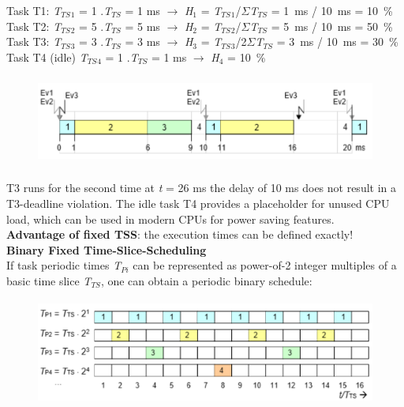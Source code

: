 Task T1:    \textit{T${}_{TS}$}${}_{1}$ = 1 $.$\textit{T${}_{TS}$} = 1 ms $\rightarrow$ \textit{H}${}_{1}$ = \textit{T${}_{TS}$}${}_{1}$/$\Sigma$\textit{T${}_{TS}$} = 1~ms / 10~ms = 10~\%
Task T2:    \textit{T${}_{TS}$}${}_{2}$ = 5 $.$\textit{T${}_{TS}$} = 5 ms $\rightarrow$ \textit{H}${}_{2}$ = \textit{T${}_{TS}$}${}_{2}$/$\Sigma$\textit{T${}_{TS}$} = 5~ms / 10~ms = 50~\%
Task T3:     \textit{T${}_{TS}$}${}_{3}$ = 3 $.$\textit{T${}_{TS}$} = 3 ms $\rightarrow$ \textit{H}${}_{3}$ = \textit{T${}_{TS}$}${}_{3}$/2$\Sigma$\textit{T${}_{TS}$} = 3~ms / 10~ms = 30~\%
Task T4 (idle) \textit{T${}_{TS}$}${}_{4}$ = 1 $.$\textit{T${}_{TS}$} = 1 ms $\rightarrow$ \textit{H}${}_{4}$ = 10~\%

	\begin{figure}[h]
    \centering
    \includegraphics[width=13cm, height=3cm]{Images/image93.png}
    \label{fig:Fig 38}
    \end{figure}

T3 runs for the second time at \textit{t} = 26 ms the delay of 10 ms does not result in a T3-deadline violation. The idle task T4 provides a placeholder for unused CPU load, which can be used in modern CPUs for power saving features.\\

\textbf{Advantage of fixed TSS}: the execution times can be defined exactly!\\

{\rot\bf Binary Fixed Time-Slice-Scheduling }\\

If task periodic times \textit{T${}_{Pi}$} can be represented as power-of-2 integer multiples of a basic time slice \textit{T${}_{TS}$}, one can obtain a periodic binary schedule:\\

	\begin{figure}[h]
    \centering
    \includegraphics[width=12cm, height=3.5cm]{Images/image94.png}
    \label{fig:Fig 39}
    \end{figure}

